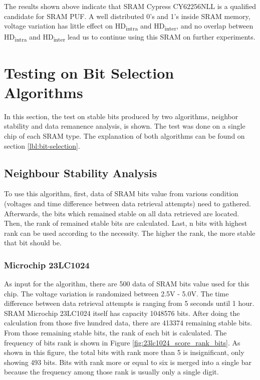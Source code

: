 The results shown above indicate that SRAM Cypress CY62256NLL is a qualified candidate for SRAM PUF. A well distributed 0's and 1's inside SRAM memory, voltage variation has little effect on HD\textsubscript{intra} and HD\textsubscript{inter}, and no overlap between HD\textsubscript{intra} and HD\textsubscript{inter} lead us to continue using this SRAM on further experiments.

\section{Testing on Bit Selection Algorithms}

In this section, the test on stable bits produced by two algorithms, neighbor stability and data remanence analysis, is shown. The test was done on a single chip of each SRAM type.
The explanation of both algorithms can be found on section \ref{lbl:bit-selection}.

\subsection{Neighbour Stability Analysis}
To use this algorithm, first, data of SRAM bits value from various condition (voltages and time difference between data retrieval attempts) need to gathered. Afterwards, the bits which remained stable on all data retrieved are located. Then, the rank of remained stable bits are calculated. Last, n bits with highest rank can be used according to the necessity. The higher the rank, the more stable that bit should be.

\subsubsection{Microchip 23LC1024}
As input for the algorithm, there are 500 data of SRAM bits value used for this chip. The voltage variation is randomized between 2.5V - 5.0V. The time difference between data retrieval attempts is ranging from 5 seconds until 1 hour.
SRAM Microchip 23LC1024 itself has capacity 1048576 bits. After doing the calculation from those five hundred data, there are 413374 remaining stable bits. From those remaining stable bits, the rank of each bit is calculated. The frequency of bits rank is shown in Figure \ref{fig:23lc1024_score_rank_bits}. As shown in this figure, the total bits with rank more than 5 is insignificant, only showing 493 bits. Bits with rank more or equal to six is merged into a single bar because the frequency among those rank is usually only a single digit.

